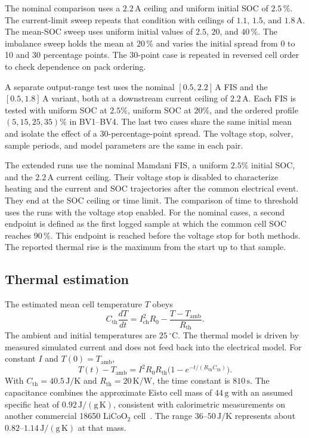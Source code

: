 \documentclass[a4paper,10pt,twocolumn]{article}
\begin{document}
The nominal comparison uses a $2.2\,\mathrm{A}$ ceiling and uniform initial SOC of $2.5\,\%$. The current-limit sweep repeats that condition with ceilings of $1.1$, $1.5$, and $1.8\,\mathrm{A}$. The mean-SOC sweep uses uniform initial values of $2.5$, $20$, and $40\,\%$. The imbalance sweep holds the mean at $20\,\%$ and varies the initial spread from 0 to 10 and 30 percentage points. The $30$-point case is repeated in reversed cell order to check dependence on pack ordering.

A separate output-range test uses the nominal $[0.5,2.2]$\,A FIS and the $[0.5,1.8]$\,A variant, both at a downstream current ceiling of $2.2$\,A. Each FIS is tested with uniform SOC at $2.5\%$, uniform SOC at $20\%$, and the ordered profile $(5,15,25,35)\%$ in BV1--BV4. The last two cases share the same initial mean and isolate the effect of a 30-percentage-point spread. The voltage stop, solver, sample periods, and model parameters are the same in each pair.

The extended runs use the nominal Mamdani FIS, a uniform $2.5\%$ initial SOC, and the $2.2$\,A current ceiling. Their voltage stop is disabled to characterize heating and the current and SOC trajectories after the common electrical event. They end at the SOC ceiling or time limit. The comparison of time to threshold uses the runs with the voltage stop enabled. For the nominal cases, a second endpoint is defined as the first logged sample at which the common cell SOC reaches $90\,\%$. This endpoint is reached before the voltage stop for both methods. The reported thermal rise is the maximum from the start up to that sample.

\subsection{Thermal estimation}
\label{sec:thermalmodel}
The estimated mean cell temperature $T$ obeys
\begin{equation}
C_{\mathrm{th}}\frac{dT}{dt}=I_{\mathrm{ch}}^{2}R_0-\frac{T-T_{\mathrm{amb}}}{R_{\mathrm{th}}}.
\label{eq:thermal}
\end{equation}
The ambient and initial temperatures are $25\,^\circ\mathrm{C}$. The thermal model is driven by measured simulated current and does not feed back into the electrical model. For constant $I$ and $T(0)=T_{\mathrm{amb}}$,
\begin{equation}
T(t)-T_{\mathrm{amb}}=I^2R_0R_{\mathrm{th}}\bigl(1-e^{-t/(R_{\mathrm{th}}C_{\mathrm{th}})}\bigr).
\label{eq:thermalcc}
\end{equation}
With $C_{\mathrm{th}}=40.5\,\mathrm{J/K}$ and $R_{\mathrm{th}}=20\,\mathrm{K/W}$, the time constant is $810\,\mathrm{s}$. The capacitance combines the approximate Eisto cell mass of $44\,\mathrm{g}$ with an assumed specific heat of $0.92\,\mathrm{J/(g\,K)}$, consistent with calorimetric measurements on another commercial 18650 LiCoO$_2$ cell~\cite{eisto2200,spinner2015}. The range $36$--$50\,\mathrm{J/K}$ represents about $0.82$--$1.14\,\mathrm{J/(g\,K)}$ at that mass.
\end{document}
